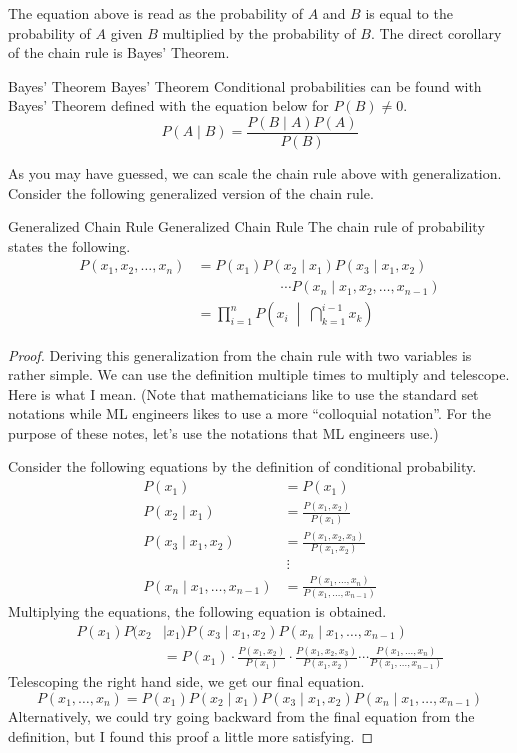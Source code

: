 \documentclass[../../../main.tex]{subfiles}
\begin{document}
The equation above is read as the probability of $A$ and $B$
is equal to the probability of $A$ given $B$ multiplied by
the probability of $B$. The direct corollary of the chain rule
is Bayes' Theorem.

\begin{theorem}
{Bayes' Theorem}
{Bayes' Theorem}
Conditional probabilities can be found with Bayes' Theorem
defined with the equation below for $P(B) \neq 0$.
\[
P(A \mid B) = \frac{P(B \mid A) P(A)}{P(B)}
\]
\end{theorem}

As you may have guessed, we can scale the chain rule above
with generalization. Consider the following generalized version
of the chain rule.

\begin{theorem}
{Generalized Chain Rule}
{Generalized Chain Rule}
The chain rule of probability states the following.
\begin{align*}
    P(x_1, x_2, \ldots, x_n)
    &= P(x_1) P(x_2 \mid x_1) P(x_3 \mid x_1, x_2) \\
        &\qquad\qquad\qquad\cdots
            P(x_n \mid x_1, x_2, \ldots, x_{n-1}) \\
    &= \prod_{i = 1}^{n} P \left(
        x_i \; \middle|\; \bigcap_{k = 1}^{i - 1} x_{k}
    \right)
\end{align*}
\end{theorem}
\begin{proof}
Deriving this generalization from the chain rule with two
variables is rather simple. We can use the definition multiple
times to multiply and telescope. Here is what I mean. (Note
that mathematicians like to use the standard set notations while
ML engineers likes to use a more ``colloquial notation''. For
the purpose of these notes, let's use the notations that ML
engineers use.)

Consider the following equations by the definition of conditional
probability.
\begin{align*}
    P(x_1) &= P(x_1) \\
    P(x_2 \mid x_1) &= \frac{P(x_1, x_2)}{P(x_1)} \\
    P(x_3 \mid x_1, x_2) &= \frac{P(x_1, x_2, x_3)}{P(x_1, x_2)} \\
    &\ \vdots \\
    P(x_n \mid x_1, \ldots, x_{n-1})
        &= \frac{P(x_1, \ldots, x_n)}{P(x_1, \ldots, x_{n-1})}
\end{align*}
Multiplying the equations, the following equation is obtained.
\begin{align*}
    P(x_1) P(x_2 &\mid x_1) P(x_3 \mid x_1, x_2)
        P(x_n \mid x_1, \ldots, x_{n-1}) \\
    &= P(x_1) \cdot \frac{P(x_1, x_2)}{P(x_1)} \cdot
        \frac{P(x_1, x_2, x_3)}{P(x_1, x_2)} \cdots
        \frac{P(x_1, \ldots, x_n)}{P(x_1, \ldots, x_{n-1})}
\end{align*}
Telescoping the right hand side, we get our final equation.
\[
P(x_1, \ldots, x_n)
= P(x_1) P(x_2 \mid x_1) P(x_3 \mid x_1, x_2)
    P(x_n \mid x_1, \ldots, x_{n-1})
\]
Alternatively, we could try going backward from the final
equation from the definition, but I found this proof a little
more satisfying.
\end{proof}
\end{document}
